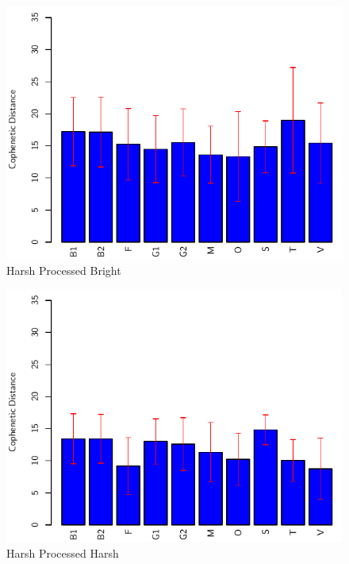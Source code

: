 		\begin{figure}[h!]
			\centering
			\includegraphics{chapter7/Images/HarshProcessedBrightBar.pdf}
			\caption{Harsh Processed Bright}
		\end{figure}

		\begin{figure}[h!]
			\centering
			\includegraphics{chapter7/Images/HarshProcessedHarshBar.pdf}
			\caption{Harsh Processed Harsh}
		\end{figure}

